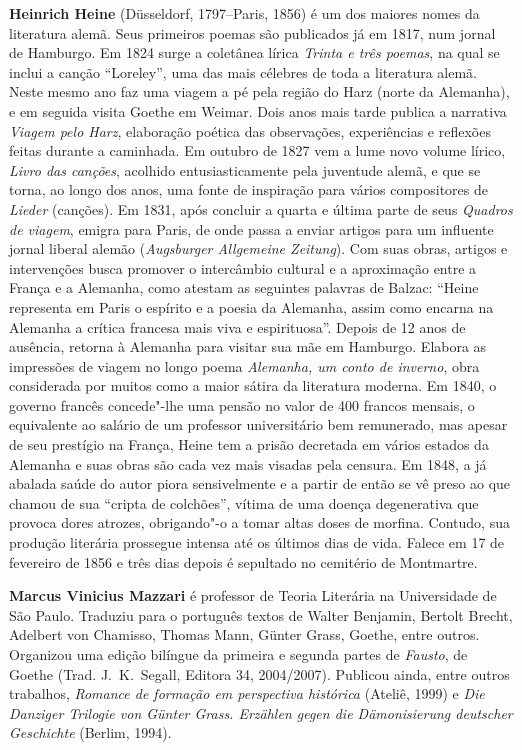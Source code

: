 \textbf{Heinrich Heine} (Düsseldorf, 1797--Paris, 1856) é um dos maiores nomes
da literatura alemã. Seus primeiros poemas são publicados já
em 1817, num jornal de Hamburgo. Em 1824 surge a coletânea lírica
\textit{Trinta e três poemas}, na qual se inclui a canção “Loreley”,
uma das mais célebres de toda a literatura alemã. Neste mesmo ano faz
uma viagem a pé pela região do Harz (norte da Alemanha), e em seguida
visita Goethe em Weimar. Dois anos mais tarde publica a narrativa
\textit{Viagem pelo Harz}, elaboração poética das observações,
experiências e reflexões feitas durante a caminhada. Em outubro de 1827
vem a lume novo volume lírico, \textit{Livro das canções}, acolhido
entusiasticamente pela juventude alemã, e que se torna, ao longo dos
anos, uma fonte de inspiração para vários compositores de
\textit{Lieder} (canções).
Em 1831, após concluir a quarta e última parte de seus \textit{Quadros
de viagem}, emigra para Paris, de onde passa a enviar artigos para um
influente jornal liberal alemão (\textit{Augsburger Allgemeine
Zeitung}). Com suas obras, artigos e intervenções busca promover o
intercâmbio cultural e a aproximação entre a França e a Alemanha, como
atestam as seguintes palavras de Balzac: “Heine representa em Paris o
espírito e a poesia da Alemanha, assim como encarna na Alemanha a
crítica francesa mais viva e espirituosa”. Depois de 12 anos de
ausência, retorna à Alemanha para visitar sua mãe em Hamburgo. Elabora
as impressões de viagem no longo poema \textit{Alemanha, um conto de
inverno}, obra considerada por muitos como a maior sátira da literatura moderna.
Em 1840, o governo francês concede"-lhe uma pensão no valor de 400 francos
mensais, o equivalente ao salário de um professor universitário bem remunerado,
mas apesar de seu prestígio na França, Heine tem a prisão decretada em vários
estados da Alemanha e suas obras são cada vez mais visadas pela censura.
Em 1848, a já abalada saúde do autor piora sensivelmente
e a partir de então se vê preso ao que chamou de sua “cripta de
colchões”, vítima de uma doença degenerativa que provoca dores atrozes,
obrigando"-o a tomar altas doses de morfina. Contudo, sua produção
literária prossegue intensa até os últimos dias de vida. Falece em 17
de fevereiro de 1856 e três dias depois é sepultado no cemitério de
Montmartre.


\textbf{Marcus Vinicius Mazzari} é professor de Teoria Literária na Universidade
de São Paulo. Traduziu para o português textos de Walter Benjamin, Bertolt
Brecht, Adelbert von Chamisso, Thomas Mann, Günter Grass, Goethe, entre outros.
Organizou uma edição bilíngue da primeira e segunda partes de \textit{Fausto},
de Goethe (Trad. J.~K.~Segall, Editora 34, 2004/2007). Publicou ainda, entre
outros trabalhos, \textit{Romance de formação em perspectiva histórica}
(Ateliê, 1999) e \textit{Die Danziger Trilogie von Günter Grass. Erzählen gegen
die Dämonisierung deutscher Geschichte} (Berlim, 1994).


